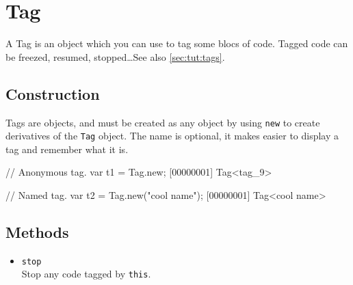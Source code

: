 \section{Tag}

A Tag is an object which you can use to tag some blocs of code.
Tagged code can be freezed, resumed, stopped\ldots See also
\autoref{sec:tut:tags}.

\subsection{Construction}
\label{stdlib:tag:ctor}

Tags are objects, and must be created as any object by using
\lstinline{new} to create derivatives of the \lstinline{Tag} object.
The name is optional, it makes easier to display a tag and remember
what it is.

\begin{urbiscript}
// Anonymous tag.
var t1 = Tag.new;
[00000001] Tag<tag_9>

// Named tag.
var t2 = Tag.new("cool name");
[00000001] Tag<cool name>
\end{urbiscript}


\subsection{Methods}
\begin{itemize}
\item \lstinline|stop|~\\
  Stop any code tagged by \lstinline|this|.
\end{itemize}

